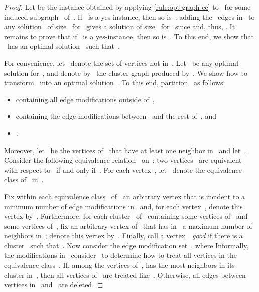 \documentclass[envcountsame,numbook,smallextended]{svjour3}
\numberwithin{equation}{section}
\numberwithin{figure}{section}
\begin{document}
\begin{proof}
  Let  be
  the instance obtained by applying 
  \cref{rule:opt-graph-ce} to~
  for some induced subgraph~ of~.
  If ~is a yes-instance, then so is~:
  adding the ~edges in~
  to any solution~ of size~
  for~
  gives a solution of size~
  for~
  since 
  and, thus,
  .
  It remains to prove that
  if ~is a yes-instance,
  then so is~.
  To this end, we show that
  ~has an optimal solution~
  such that~. 

  For convenience,
  let~ denote
  the set of vertices not in~.
  Let~ be any optimal solution for~,
  and denote by~
  the cluster graph produced by~.
  We show how to transform~
  into an optimal solution~.
  To this end,
  partition~ as follows:
  \begin{itemize}
  \item  containing
    all edge modifications outside of~,
  \item 
    containing the edge modifications between~ and the rest of~, and
  \item .
  \end{itemize}
  Moreover, let~ be the vertices of~
  that have at least one neighbor in~
  and let~.
  Consider the following equivalence relation~
  on~: two vertices~ are equivalent with respect to~ if and only
  if~.  For each vertex~, let ~denote the
  equivalence class of~ in~.
  


  Fix within each equivalence class~ of~ an
  arbitrary vertex that is incident to a minimum number of edge
  modifications in~ and, for each vertex~, denote this vertex
  by~.
  Furthermore, for each cluster~ of~
  containing some vertices of~ and some vertices
  of~, fix an arbitrary vertex of~ that has in~ a maximum
  number of neighbors in~; denote this vertex
  by~. Finally, call a vertex~~\emph{good} if there
  is a cluster~ such that~.
  Now consider the edge modification set~, where 
  Informally, the modifications in~ consider~ to
  determine how to treat all vertices in the equivalence
  class~. If, among the vertices of~,  has the most neighbors in its cluster
  in~, then all vertices of~ are treated
  like~. Otherwise, all edges between vertices in~
  and~ are deleted.


\end{proof}
\end{document}
